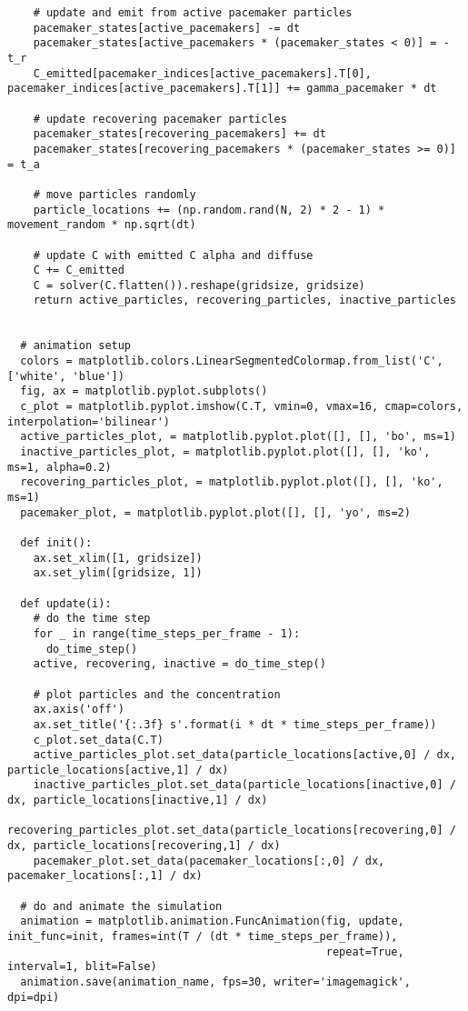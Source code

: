 \begin{verbatim}
    # update and emit from active pacemaker particles
    pacemaker_states[active_pacemakers] -= dt
    pacemaker_states[active_pacemakers * (pacemaker_states < 0)] = -t_r
    C_emitted[pacemaker_indices[active_pacemakers].T[0], pacemaker_indices[active_pacemakers].T[1]] += gamma_pacemaker * dt

    # update recovering pacemaker particles
    pacemaker_states[recovering_pacemakers] += dt
    pacemaker_states[recovering_pacemakers * (pacemaker_states >= 0)] = t_a

    # move particles randomly
    particle_locations += (np.random.rand(N, 2) * 2 - 1) * movement_random * np.sqrt(dt)

    # update C with emitted C alpha and diffuse
    C += C_emitted
    C = solver(C.flatten()).reshape(gridsize, gridsize)
    return active_particles, recovering_particles, inactive_particles


  # animation setup
  colors = matplotlib.colors.LinearSegmentedColormap.from_list('C', ['white', 'blue'])
  fig, ax = matplotlib.pyplot.subplots()
  c_plot = matplotlib.pyplot.imshow(C.T, vmin=0, vmax=16, cmap=colors, interpolation='bilinear')
  active_particles_plot, = matplotlib.pyplot.plot([], [], 'bo', ms=1)
  inactive_particles_plot, = matplotlib.pyplot.plot([], [], 'ko', ms=1, alpha=0.2)
  recovering_particles_plot, = matplotlib.pyplot.plot([], [], 'ko', ms=1)
  pacemaker_plot, = matplotlib.pyplot.plot([], [], 'yo', ms=2)

  def init():
    ax.set_xlim([1, gridsize])
    ax.set_ylim([gridsize, 1])

  def update(i):
    # do the time step
    for _ in range(time_steps_per_frame - 1):
      do_time_step()
    active, recovering, inactive = do_time_step()

    # plot particles and the concentration
    ax.axis('off')
    ax.set_title('{:.3f} s'.format(i * dt * time_steps_per_frame))
    c_plot.set_data(C.T)
    active_particles_plot.set_data(particle_locations[active,0] / dx, particle_locations[active,1] / dx)
    inactive_particles_plot.set_data(particle_locations[inactive,0] / dx, particle_locations[inactive,1] / dx)
    recovering_particles_plot.set_data(particle_locations[recovering,0] / dx, particle_locations[recovering,1] / dx)
    pacemaker_plot.set_data(pacemaker_locations[:,0] / dx, pacemaker_locations[:,1] / dx)

  # do and animate the simulation
  animation = matplotlib.animation.FuncAnimation(fig, update, init_func=init, frames=int(T / (dt * time_steps_per_frame)),
                                                 repeat=True, interval=1, blit=False)
  animation.save(animation_name, fps=30, writer='imagemagick', dpi=dpi)



\end{verbatim}
